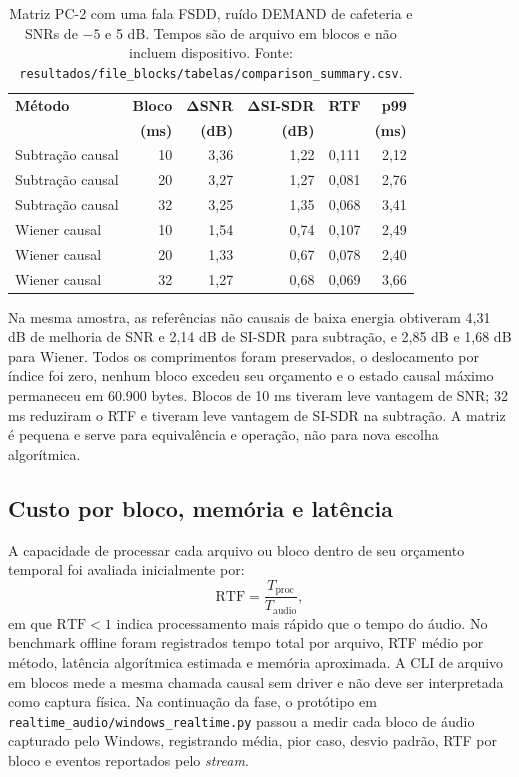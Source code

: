 \begin{table}[!htbp]
\centering
\caption[Processamento causal de arquivo por tamanho de bloco]{Matriz PC-2 com uma fala FSDD, ruído DEMAND de cafeteria e SNRs de \(-5\) e 5 dB. Tempos são de arquivo em blocos e não incluem dispositivo. Fonte: \texttt{resultados/file\_blocks/tabelas/comparison\_summary.csv}.}
\label{tab:file-blocks}
\footnotesize
\begin{tabularx}{\textwidth}{Xrrrrr}
\toprule
\textbf{Método} & \textbf{Bloco} & \(\boldsymbol{\Delta}\)\textbf{SNR} & \(\boldsymbol{\Delta}\)\textbf{SI-SDR} & \textbf{RTF} & \textbf{p99} \\
& \textbf{(ms)} & \textbf{(dB)} & \textbf{(dB)} & & \textbf{(ms)} \\
\midrule
Subtração causal & 10 & 3,36 & 1,22 & 0,111 & 2,12 \\
Subtração causal & 20 & 3,27 & 1,27 & 0,081 & 2,76 \\
Subtração causal & 32 & 3,25 & 1,35 & 0,068 & 3,41 \\
Wiener causal & 10 & 1,54 & 0,74 & 0,107 & 2,49 \\
Wiener causal & 20 & 1,33 & 0,67 & 0,078 & 2,40 \\
Wiener causal & 32 & 1,27 & 0,68 & 0,069 & 3,66 \\
\bottomrule
\end{tabularx}
\end{table}
\FloatBarrier

Na mesma amostra, as referências não causais de baixa energia obtiveram 4,31 dB de melhoria de SNR e 2,14 dB de SI-SDR para subtração, e 2,85 dB e 1,68 dB para Wiener. Todos os comprimentos foram preservados, o deslocamento por índice foi zero, nenhum bloco excedeu seu orçamento e o estado causal máximo permaneceu em 60.900 bytes. Blocos de 10 ms tiveram leve vantagem de SNR; 32 ms reduziram o RTF e tiveram leve vantagem de SI-SDR na subtração. A matriz é pequena e serve para equivalência e operação, não para nova escolha algorítmica.

\subsection{Custo por bloco, memória e latência}

A capacidade de processar cada arquivo ou bloco dentro de seu orçamento temporal foi avaliada inicialmente por:
\begin{equation}
    \mathrm{RTF} = \frac{T_{\mathrm{proc}}}{T_{\mathrm{audio}}},
\end{equation}
em que \(\mathrm{RTF}<1\) indica processamento mais rápido que o tempo do áudio. No benchmark offline foram registrados tempo total por arquivo, RTF médio por método, latência algorítmica estimada e memória aproximada. A CLI de arquivo em blocos mede a mesma chamada causal sem driver e não deve ser interpretada como captura física. Na continuação da fase, o protótipo em \texttt{realtime\_audio/windows\_realtime.py} passou a medir cada bloco de áudio capturado pelo Windows, registrando média, pior caso, desvio padrão, RTF por bloco e eventos reportados pelo \textit{stream}.

